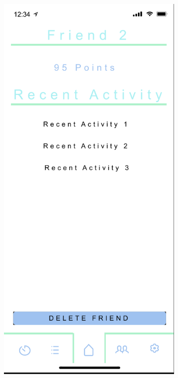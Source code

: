 \begin{figure}[H]
    \centering
    \begin{subfigure}[b]{0.3\textwidth}
        \centering
        \includegraphics[width=\textwidth]{./graphics/design/Friends - Recent Activity.png}

\end{subfigure}
\end{figure}
